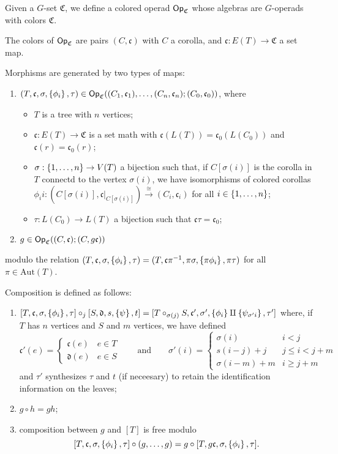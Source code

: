 \documentclass[psamsfonts,onesided,10pt,letterpaper]{amsart}%
\renewcommand{\C}{\ensuremath{\mathfrak{C}}}
\renewcommand{\fc}{\ensuremath{\mathfrak{c}}}
\begin{document}
Given a $G$-set $\C$, we define a colored operad $\Op_\C$ whose algebras are $G$-operads with colors $\C$.

The colors of $\Op_\C$ are pairs $(C,\fc)$ with $C$ a corolla, and $\fc: E(T) \to \C$ a set map.

Morphisms are generated by two types of maps:
\begin{enumerate}
\item $(T,\fc,\sigma,\set{\phi_i},\tau)\in \Op_\C((C_1,\fc_1), \ldots, (C_n,\fc_n); (C_0,\fc_0))$, where
  \begin{itemize}
  \item $T$ is a tree with $n$ vertices;
  \item $\fc: E(T)\to \C$ is a set math with $\fc(L(T)) = \fc_0(L(C_0))$ and $\fc(r) = \fc_0(r)$;
  \item $\sigma: \left\{1,\ldots, n\right\}\to V(T)$ a bijection such that, if $C[\sigma(i)]$ is the corolla in $T$ connectd to the vertex $\sigma(i)$, we have isomorphisms of colored corollas $\phi_ii: (C[\sigma(i)], \fc|_{C[\sigma(i)]})\xrightarrow{\cong} (C_i, \fc_i)$ for all $i\in \left\{1,\ldots, n\right\}$;
  \item $\tau: L(C_0)\to L(T)$ a bijection such that $\fc\tau = \fc_0$;
  \end{itemize}
\item $g\in \Op_\C((C,\fc); (C,g\fc))$
\end{enumerate}
modulo the relation $(T,\fc,\sigma,\set{\phi_i},\tau) = (T,\fc\pi^{-1},\pi\sigma,\set{\pi\phi_i},\pi\tau)$ for all $\pi\in \mathrm{Aut}(T)$.

Composition is defined as follows:
\begin{enumerate}
\item $[T,\fc,\sigma,\set{\phi_i},\tau] \circ_j [S,\mathfrak{d}, s, \set{\psi}, t] = [T\circ_{\sigma(j)}S, \fc', \sigma', \set{\phi_i}\amalg\set{\psi_{\sigma' i}}, \tau']$ where, if $T$ has $n$ vertices and $S$ and $m$ vertices, we have defined
\[
\fc'(e) = \begin{cases}\fc(e) & e\in T\\ \mathfrak{d}(e) & e\in S\end{cases} \qquad \mbox{and} \qquad 
\sigma'(i) =
\begin{cases}
  \sigma(i) & i< j\\
  s(i-j)+j & j\leq i < j+m\\
  \sigma(i-m)+m & i\geq j+m
\end{cases}
\]
and $\tau'$ synthesizes $\tau$ and $t$ (if neceesary) to retain the identification information on the leaves;
\item $g\circ h = gh$;
\item composition between $g$ and $[T]$ is free modulo
\[
[T,\fc,\sigma,\set{\phi_i},\tau] \circ (g,\ldots,g) = g\circ [T,g\fc,\sigma,\set{\phi_i}, \tau].
\]
\end{enumerate}
\end{document}
